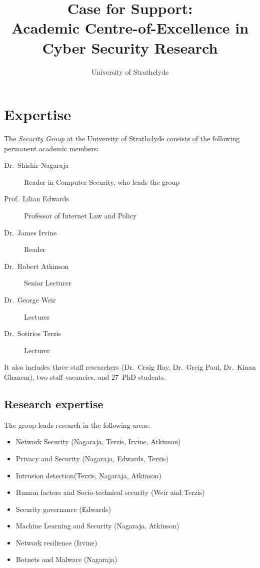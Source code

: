\documentclass[11pt]{article}
\title{Case for Support:\\Academic Centre-of-Excellence in Cyber Security Research}
\author{University of Strathclyde}
\date{}
\def\numphdstudents{27}
\begin{document}
\maketitle

\section{Expertise}
    The \emph{Security Group} at the University of Strathclyde consists of the
    following permanent academic members:
    \begin{description}
        \item[Dr.\ Shishir Nagaraja] Reader in Computer Security, who leads the group
        \item[Prof.\ Lilian Edwards] Professor of Internet Law and Policy
        \item[Dr.\ James Irvine] Reader
        \item[Dr.\ Robert Atkinson] Senior Lecturer
        \item[Dr.\ George Weir] Lecturer
        \item[Dr.\ Sotirios Terzis] Lecturer
    \end{description}
    It also includes three staff researchers (Dr.\ Craig Hay, Dr.\ Greig Paul, Dr.\ Kinan Ghanem), two staff vacancies, and \numphdstudents \ PhD students.

    \subsection{Research expertise}
    The group leads research in the following areas:
    \begin{itemize}
    \item Network Security (Nagaraja, Terzis, Irvine, Atkinson)
    \item Privacy and Security (Nagaraja, Edwards, Terzis)
    \item Intrusion detection(Terzis, Nagaraja, Atkinson)
    \item Human factors and Socio-technical security (Weir and Terzis)
    \item Security governance (Edwards)
    \item Machine Learning and Security (Nagaraja, Atkinson)
    \item Network resilience (Irvine)
    \item Botnets and Malware (Nagaraja)
    \end{itemize}
\end{document}
